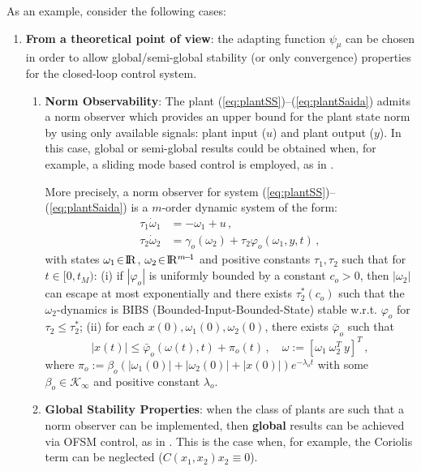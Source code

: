 \documentclass[letterpaper, 10 pt, journal, twocolumn]{IEEEtran}  %
\def\re{{\rm I}\! {\rm R}}
\theoremstyle{plain}
\theoremstyle{definition}
\theoremstyle{remark}
\begin{document}
As an example, consider the following cases:
%
\begin{enumerate}

\item {\bf From a theoretical point of view}: the adapting function $\psi_\mu$ can be chosen in order to allow global/semi-global stability (or only convergence) properties for the closed-loop control system. 

\begin{enumerate}

\item {\bf Norm Observability}: The plant
(\ref{eq:plantSS})--(\ref{eq:plantSaida}) admits a norm observer which provides an upper bound for the plant state norm by using only  available signals: plant input ($u$) and plant output ($y$). In this case, global or semi-global results could be obtained when, for example, a sliding mode based control is employed, as in \cite{POH:2011}.  


More precisely, a norm observer for system
(\ref{eq:plantSS})--(\ref{eq:plantSaida})  is a $m$-order
dynamic system of the form:
%
\begin{align}
\tau_1 \dot{\omega}_1 &= -\omega_1+u\,, \label{eq:defuav} \\
\tau_2 \dot{\omega}_2 &=
\gamma_o(\omega_2)+\tau_2\varphi_o(\omega_1,y,t)\,,\label{eq:normobsgeneric}
\end{align}
%
with states $\omega_1\!\in\!\re$, $\omega_2\!\in\!\re^{m\!-\!1}$ and
positive constants $\tau_1, \tau_2$ such that for $t\in[0,t_M)$: (i)
if $|\varphi_o|$ is uniformly bounded by a constant $c_o\!>\!0$,
then $|\omega_2|$ can escape at most exponentially and there exists
$\tau_2^*(c_o)$ such that the $\omega_2$-dynamics is BIBS
(Bounded-Input-Bounded-State) stable w.r.t. $\varphi_o$ for
$\tau_2\leq \tau_2^*$; (ii)
for each $x(0),\omega_1(0),\omega_2(0)$, there exists $\bar{\varphi}_o$ such that
%
\begin{equation}
|x(t)| \leq \bar{\varphi}_o(\omega(t),t) + \pi_o(t) \,, \quad
\omega:=[\omega_1 \ \omega_2^T \ y]^T\,,\label{eq:xboundfromw}
\end{equation}
%
where
$\pi_o:=\beta_o(|\omega_1(0)|\!+\!|\omega_2(0)|\!+\!|x(0)|)e^{-\lambda_o
t}$ with some $\beta_o \in \mathcal{K}_\infty$ and positive
constant $\lambda_o$.

\item {\bf Global Stability Properties}: when the class of plants are such that a norm observer can be implemented, then {\bf global} results can be achieved via OFSM control, as in \cite{POH:2011}. This is the case  when, for example, the Coriolis term can be neglected ($C(x_1,x_2) x_2 \equiv 0$).



\end{enumerate}
\end{enumerate}
\end{document}
